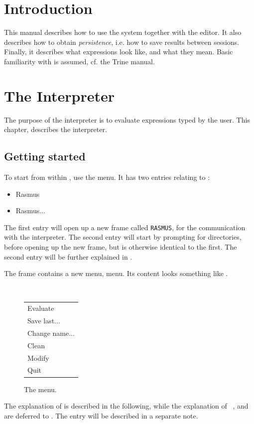 \section{Introduction}
This manual describes how to use the \RAS{} system together with the
\EMACS{} editor. It also describes how to obtain {\it persistence\/},
i.e. how to save results between sessions. Finally, it describes what
\RAS{} expressions look like, and what they mean. Basic familiarity
with \EMACS{} is assumed, cf. the {\sc Trine} manual.

\section{The Interpreter}
\label{theinterpreter}
The purpose of the \RAS{} interpreter is to evaluate expressions typed
by the user.   This chapter, describes the \RAS{} interpreter.

\subsection{Getting started}
\label{thewindowsystem}
To start \RAS{} from within \EMACS{}, use the  menu. It has
two entries relating to \RAS{}:
\begin{itemize}
\bf
\item Rasmus
\item Rasmus...
\end{itemize}
The first entry will open up a new frame called {\tt RASMUS}, for the
communication with the \RAS{} interpreter. The second entry will start
by prompting for directories, before opening up the new frame, but is
otherwise identical to the first. The second entry will be further
explained in .

\samepage The \RAS{} frame contains a new menu,  menu.
Its content looks something like .
\begin{figure}[H]
  \begin{center} \tt
    \begin{tabular}{|l|}
      \hline
      Evaluate\\
      Save last... \\
      Change name...\\
      Clean \\
      Modify\\
      Quit \\ 
      \hline
    \end{tabular}
  \end{center}
  \caption{The  menu.}
  \label{fig:rasmus-menu}
\end{figure}
The explanation of  is described in the following,
while the explanation of ~, 
and  are deferred to . The
 entry will be described in a separate note.

